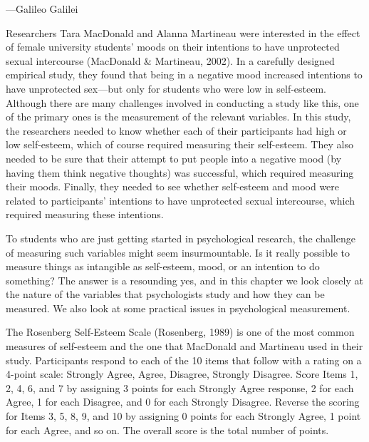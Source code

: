 \documentclass[]{book}
\theoremstyle{definition}
\theoremstyle{definition}
\theoremstyle{remark}
\begin{document}
{---Galileo Galilei}

Researchers Tara MacDonald and Alanna Martineau were interested in the
effect of female university students' moods on their intentions to have
unprotected sexual intercourse (MacDonald \& Martineau, 2002). In a
carefully designed empirical study, they found that being in a negative
mood increased intentions to have unprotected sex---but only for
students who were low in self-esteem. Although there are many challenges
involved in conducting a study like this, one of the primary ones is the
measurement of the relevant variables. In this study, the researchers
needed to know whether each of their participants had high or low
self-esteem, which of course required measuring their self-esteem. They
also needed to be sure that their attempt to put people into a negative
mood (by having them think negative thoughts) was successful, which
required measuring their moods. Finally, they needed to see whether
self-esteem and mood were related to participants' intentions to have
unprotected sexual intercourse, which required measuring these
intentions.

To students who are just getting started in psychological research, the
challenge of measuring such variables might seem insurmountable. Is it
really possible to measure things as intangible as self-esteem, mood, or
an intention to do something? The answer is a resounding yes, and in
this chapter we look closely at the nature of the variables that
psychologists study and how they can be measured. We also look at some
practical issues in psychological measurement.

The Rosenberg Self-Esteem Scale (Rosenberg, 1989) is one of the most
common measures of self-esteem and the one that MacDonald and Martineau
used in their study. Participants respond to each of the 10 items that
follow with a rating on a 4-point scale: Strongly Agree, Agree,
Disagree, Strongly Disagree. Score Items 1, 2, 4, 6, and 7 by assigning
3 points for each Strongly Agree response, 2 for each Agree, 1 for each
Disagree, and 0 for each Strongly Disagree. Reverse the scoring for
Items 3, 5, 8, 9, and 10 by assigning 0 points for each Strongly Agree,
1 point for each Agree, and so on. The overall score is the total number
of points.
\end{document}
